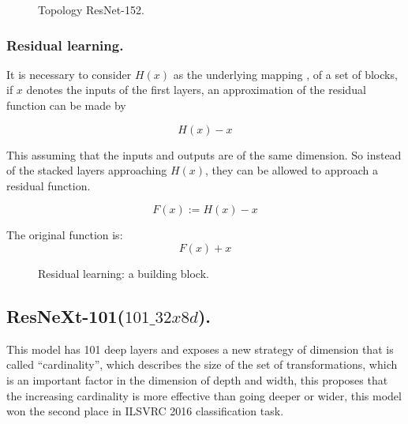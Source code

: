 \documentclass[letterpaper,12pt,openright,oneside]{article}
\begin{document}
\begin{figure}[H]
\centerline{}
\caption{Topology ResNet-152.}
\label{ResNet}
\end{figure}


\subsubsection{Residual learning.}

It is necessary to consider $H(x)$ as the underlying mapping \cite{he2015deep}, of a set of blocks, if $x$ denotes the inputs of the first layers, an approximation of the residual function can be made by

\begin{equation}
H(x) - x
\end{equation}

This assuming that the inputs and outputs are of the same dimension. So instead of the stacked layers approaching $H(x)$, they can be allowed to approach a residual function.

\begin{equation}
F(x):= H(x) - x
\end{equation}

The original function is:
\begin{equation}
F(x) + x
\end{equation}


\begin{figure}[H]
\centerline{}
\caption{Residual learning: a building block.}
\label{fig 97}
\end{figure}




\subsection{ResNeXt-101($101\_32x8d$).}
This model has 101 deep layers \cite{xie2017aggregated} and exposes a new strategy of dimension that is called “cardinality”, which describes the size of the set of transformations, which is an important factor in the dimension of depth and width, this proposes that the increasing cardinality is more effective than going deeper or wider, this model won the second place in ILSVRC 2016 classification task.\\

\end{document}
